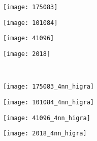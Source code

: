 \begin{figure}[!ht] 
   
    \begin{subfigure}[t]{\textwidth+20pt\relax}
    	\centering
    	\texttt{[image: 175083]} 
    \end{subfigure}      
    \begin{subfigure}[b]{0.23\textwidth}
    	\centering
        \texttt{[image: 101084]}
    \end{subfigure}
    \begin{subfigure}[b]{0.23\textwidth}
    	\centering
        \texttt{[image: 41096]}
    \end{subfigure}
    \begin{subfigure}[b]{0.23\textwidth}
    	\centering
        \texttt{[image: 2018]}
    \end{subfigure} \\ \vspace{-5pt}      
    
        
    \begin{subfigure}[t]{\textwidth+20pt\relax}
    	\centering
    	\texttt{[image: 175083\_4nn\_higra]} 
    \end{subfigure}      
    \begin{subfigure}[b]{0.23\textwidth}
    	\centering
        \texttt{[image: 101084\_4nn\_higra]}
    \end{subfigure}
    \begin{subfigure}[b]{0.23\textwidth}
    	\centering
        \texttt{[image: 41096\_4nn\_higra]}
    \end{subfigure}
    \begin{subfigure}[b]{0.23\textwidth}
    	\centering
        \texttt{[image: 2018\_4nn\_higra]}
    \end{subfigure} \\ \vspace{-5pt} 
    

\end{figure}
